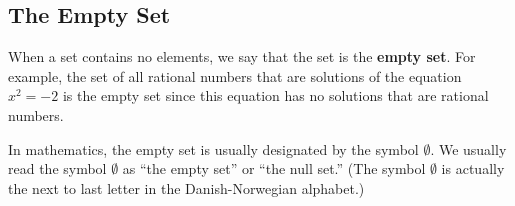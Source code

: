 \subsection*{The Empty Set}
When a set contains no elements, we say that the set is the \textbf{empty set}. 
\label{sym:empty}%
%
  For example, the set of all rational numbers that are solutions of the equation $x^2 = -2$ is the empty set since this equation has no solutions that are rational numbers.  


In mathematics, the empty set is usually designated by the symbol  $\emptyset $.  We usually read the symbol  $\emptyset $ as ``the empty set'' or ``the null set.''  (The symbol  $\emptyset $ is actually the next to last letter in the Danish-Norwegian alphabet.)
\hbreak


\endinput
